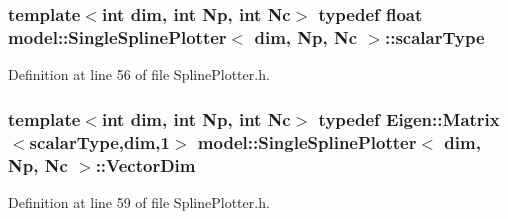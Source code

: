 \hypertarget{classmodel_1_1_single_spline_plotter_aa7a9de72b38d4d60ca52a5b62570e45a}{}
\subsubsection[{scalar\+Type}]{\setlength{\rightskip}{0pt plus 5cm}template$<$int dim, int Np, int Nc$>$ typedef float {\bf model\+::\+Single\+Spline\+Plotter}$<$ {\bf dim}, Np, {\bf Nc} $>$\+::{\bf scalar\+Type}}\label{classmodel_1_1_single_spline_plotter_aa7a9de72b38d4d60ca52a5b62570e45a}


Definition at line 56 of file Spline\+Plotter.\+h.

\hypertarget{classmodel_1_1_single_spline_plotter_aac0dc9b9bcd8a574fab46652cc669602}{}
\subsubsection[{Vector\+Dim}]{\setlength{\rightskip}{0pt plus 5cm}template$<$int dim, int Np, int Nc$>$ typedef Eigen\+::\+Matrix$<${\bf scalar\+Type},{\bf dim},1$>$ {\bf model\+::\+Single\+Spline\+Plotter}$<$ {\bf dim}, Np, {\bf Nc} $>$\+::{\bf Vector\+Dim}}\label{classmodel_1_1_single_spline_plotter_aac0dc9b9bcd8a574fab46652cc669602}


Definition at line 59 of file Spline\+Plotter.\+h.




